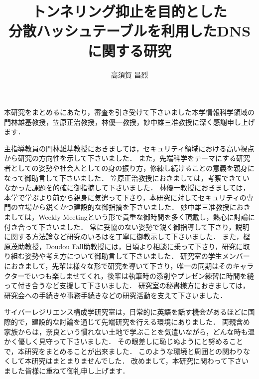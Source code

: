 \documentclass[12pt]{jarticle} %
\title{トンネリング抑止を目的とした\\分散ハッシュテーブルを利用したDNSに関する研究}
\author{高須賀 昌烈}
\begin{document}
\titlepage
\cmemberspage
\firstabstract
\secondabstract



\toc
\newpage
\listoffigures
\newpage
\listoftables
\newpage
\listofalgorithms



\newpage
{}











\newpage
\acknowledgements
本研究をまとめるにあたり，審査を引き受けて下さいました本学情報科学領域の門林雄基教授，笠原正治教授，林優一教授，妙中雄三准教授に深く感謝申し上げます．

主指導教員の門林雄基教授におきましては，セキュリティ領域における高い視点から研究の方向性を示して下さいました．
また，先端科学をテーマにする研究者としての姿勢や社会人としての身の振り方，修練し続けることの意義を親身になって御助言して下さいました．
笠原正治教授におきましては，考察できていなかった課題を的確に御指摘して下さいました．
林優一教授におきましては，本学で学ぶより前から親身に気遣って下さり，本研究に対してセキュリティの専門の立場から鋭くかつ建設的な御指摘を下さいました．
妙中雄三准教授におきましては，Weekly Meetingという形で貴重な御時間を多く頂戴し，熱心に討論に付き合って下さいました．
常に妥協のない姿勢で鋭く御指導して下さり，説明に関する方法論など研究のいろはを丁寧に御教示して下さいました．
また，樫原茂助教授，Doudou Fall助教授には，日頃より相談に乗って下さり，研究に取り組む姿勢や考え方について御助言して下さいました．
研究室の学生メンバーにおきまして，先輩は様々な形で研究を導いて下さり，唯一の同期はそのキャラクターでいつも楽しませてくれ，後輩は執筆時の添削やプレゼン練習に時間を縫って付き合うなど支援して下さいました．
研究室の秘書様方におきましては，研究会への手続きや事務手続きなどの研究活動を支えて下さいました．

サイバーレジリエンス構成学研究室は，日常的に英語を話す機会があるほどに国際的で，建設的な討論を通じて先端研究を行える環境にありました．
両親含め家族からは，奈良という慣れない土地で学ぶことを気遣いながら，どんな時も温かく優しく見守って下さいました．
その眼差しに恥じぬようにと努めることで，本研究をまとめることが出来ました．
このような環境と周囲との関わりなくして本研究はまとまりませんでした．
改めまして，本研究に関わって下さいました皆様に重ねて御礼申し上げます．
\end{document}
